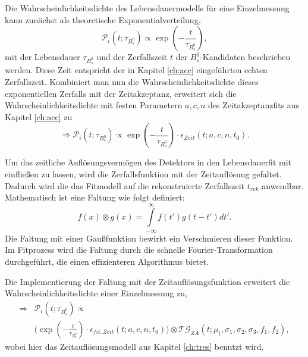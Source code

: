 \documentclass{article}
\begin{document}
Die Wahrscheinlichkeitsdichte des Lebensdauermodells für eine Einzelmessung kann zunächst als theoretische Exponentialverteilung, 
\[\mathcal{P}_i(t;\tau_{B_s^0}) \propto \exp(-\frac{t}{\tau_{B_s^0}}),\] mit der Lebensdauer $\tau_{B_s^0}$ und der Zerfallszeit $t$ der $B_s^0$-Kandidaten beschrieben werden. Diese Zeit entspricht der in Kapitel \ref{ch:acc} eingeführten echten Zerfallszeit.  
Kombiniert man nun die Wahrscheinlichkeitsdichte dieses exponentiellen Zerfalls mit der Zeitakzeptanz, erweitert sich die Wahrscheinlichkeitsdichte mit festen Parametern $a,c,n$ des Zeitakzeptanzfits aus Kapitel \ref{ch:acc} zu
\[\Rightarrow \mathcal{P}_i(t;\tau_{B_s^0}) \propto \exp(-\frac{t}{\tau_{B_s^0}}) \cdot \epsilon_{Zeit}(t;a,c,n,t_0).\]

Um das zeitliche Auflösungsvermögen des Detektors in den Lebensdauerfit mit einfließen zu lassen, wird die Zerfallsfunktion mit der Zeitauflösung gefaltet. Dadurch wird die das Fitmodell auf die rekonstruierte Zerfallszeit $t_{rek}$ anwendbar. Mathematisch ist eine Faltung wie folgt definiert:
\[ f(x) \otimes g(x)=\int\limits_{-\infty}^{\infty}f(t')g(t-t')dt'.\] 
Die Faltung mit einer Gaußfunktion bewirkt ein Verschmieren dieser Funktion. Im Fitprozess wird die Faltung durch die schnelle Fourier-Transformation \cite{FFT} durchgeführt, die einen effizienteren Algorithmus bietet. 

Die Implementierung der Faltung mit der Zeitauflösungsfunktion erweitert die Wahrscheinlichkeitsdichte einer Einzelmessung zu,
\begin{align*}
\Rightarrow &\mathcal{P}_i(t;\tau_{B_s^0}) \propto  \\ & \big( \exp(-\frac{t}{\tau_{B_s^0}}) \cdot \epsilon_{fit,Zeit}(t;a,c,n,t_0)\big)\otimes \mathcal{TG}_{ZA}(t;\mu_t,\sigma_1,\sigma_2,\sigma_3,f_1,f_2),
\end{align*}
wobei hier das Zeitauflösungsmodell aus Kapitel \ref{ch:tres} benutzt wird.

\end{document}
